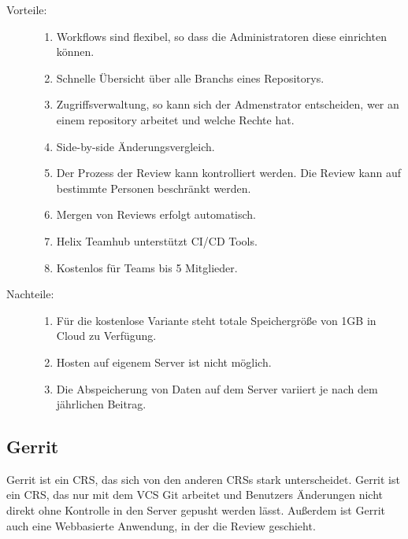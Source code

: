 \begin{description}
	\item [Vorteile:] \hfill
	\begin{enumerate}
		\item Workflows sind flexibel, so dass die Administratoren diese einrichten können.
		\item Schnelle Übersicht über alle Branchs eines Repositorys.
		\item Zugriffsverwaltung, so kann sich der Admenstrator entscheiden, wer an einem repository arbeitet und welche Rechte hat.
		\item Side-by-side Änderungsvergleich.
		\item Der Prozess der Review kann kontrolliert werden. Die Review kann auf bestimmte Personen beschränkt werden.
		\item Mergen von Reviews erfolgt automatisch.
		\item Helix Teamhub unterstützt \ac{CI}/\ac{CD} Tools.
		\item Kostenlos für Teams bis 5 Mitglieder.
	\end{enumerate}
	
	\item [Nachteile:] \hfill
	\begin{enumerate}
	\item Für die kostenlose Variante steht totale Speichergröße von 1GB in Cloud zu Verfügung.
	\item Hosten auf eigenem Server ist nicht möglich.
	\item Die Abspeicherung von Daten auf dem Server variiert je nach dem jährlichen Beitrag.
	\end{enumerate}
\end{description}


\subsection{Gerrit}
\label{subsec:Gerrit}

Gerrit ist ein \ac{CRS}, das sich von den anderen \acp{CRS} stark unterscheidet. Gerrit ist ein \ac{CRS}, das nur mit dem \ac{VCS} Git arbeitet und Benutzers Änderungen nicht direkt ohne Kontrolle in den Server gepusht werden lässt. Außerdem ist Gerrit auch eine Webbasierte Anwendung, in der die Review geschieht.

